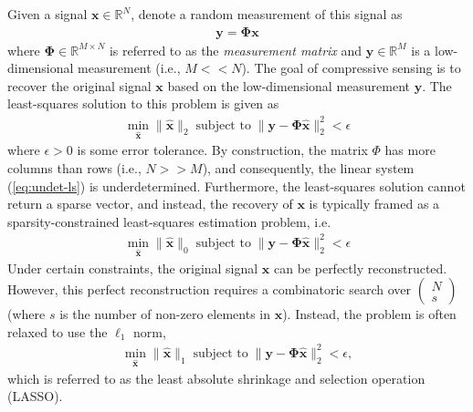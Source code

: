 Given a signal $\mathbf{x}\in\mathbb{R}^N$, denote a random measurement of this signal as 
\begin{align*}
    \mathbf{y} = \mathbf{\Phi}\mathbf{x}
\end{align*}
where $\mathbf{\Phi}\in\mathbb{R}^{M\times N}$ is referred to as the \emph{measurement matrix} and $\mathbf{y}\in\mathbb{R}^{M}$ is a low-dimensional measurement (i.e., $M << N$). The goal of compressive sensing is to recover the original signal $\mathbf{x}$ based on the low-dimensional measurement $\mathbf{y}$. The least-squares solution to this problem is given as
\begin{align}
    \min_{\hat{\mathbf{x}}}\|\hat{\mathbf{x}}\|_2 \; \text{subject to} \; \|\mathbf{y} - \mathbf{\Phi}\hat{\mathbf{x}}\|_2^2 < \epsilon \label{eq:undet-ls}
\end{align}
where $\epsilon > 0$ is some error tolerance. By construction, the matrix $\Phi$ has more columns than rows (i.e., $N >> M$), and consequently, the linear system (\ref{eq:undet-ls}) is underdetermined. Furthermore, the least-squares solution cannot return a sparse vector, and instead, the recovery of $\mathbf{x}$ is typically framed as a sparsity-constrained least-squares estimation problem, i.e.
\begin{align}
    \min_{\hat{\mathbf{x}}}\|\hat{\mathbf{x}}\|_0 \; \text{subject to} \; \|\mathbf{y} - \mathbf{\Phi}\hat{\mathbf{x}}\|_2^2 < \epsilon \label{eq:sparse-ls}
\end{align}
Under certain constraints, the original signal $\mathbf{x}$ can be perfectly reconstructed. However, this perfect reconstruction requires a combinatoric search over $\begin{pmatrix}N \\ s\end{pmatrix}$ (where $s$ is the number of non-zero elements in $\mathbf{x}$).
Instead, the problem is often relaxed to use the $\ell_1$ norm,
\begin{align}
    \min_{\hat{\mathbf{x}}}\|\hat{\mathbf{x}}\|_1 \; \text{subject to} \; \|\mathbf{y} - \mathbf{\Phi}\hat{\mathbf{x}}\|_2^2 < \epsilon, \label{eq:lasso-ls}
\end{align}
which is referred to as the least absolute shrinkage and selection operation (LASSO). 

